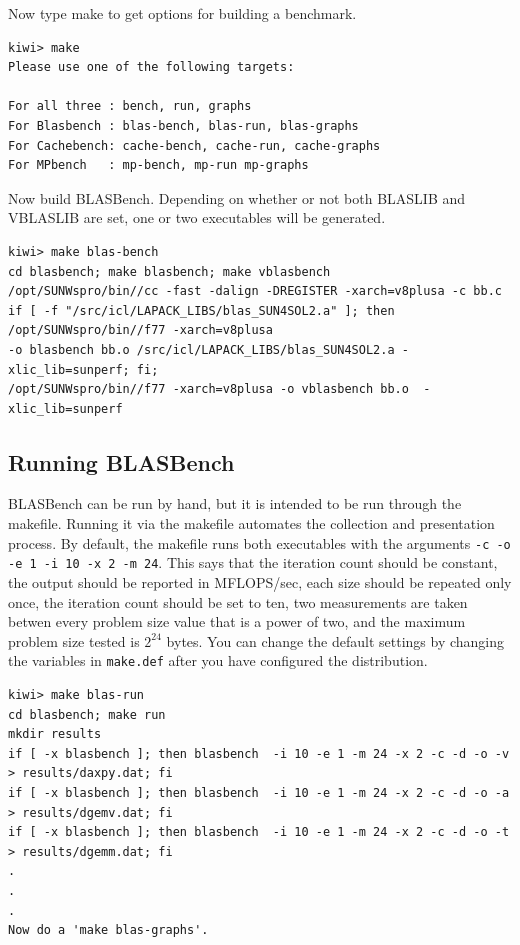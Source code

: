\documentclass [12pt]{article}
\begin{document}
Now type make to get options for building a benchmark.

\begin{verbatim}
kiwi> make
Please use one of the following targets:

For all three : bench, run, graphs
For Blasbench : blas-bench, blas-run, blas-graphs
For Cachebench: cache-bench, cache-run, cache-graphs
For MPbench   : mp-bench, mp-run mp-graphs

\end{verbatim}

Now build BLASBench.  Depending on whether or not both BLASLIB and VBLASLIB are set,
one or two executables will be generated.

\begin{verbatim}
kiwi> make blas-bench
cd blasbench; make blasbench; make vblasbench
/opt/SUNWspro/bin//cc -fast -dalign -DREGISTER -xarch=v8plusa -c bb.c
if [ -f "/src/icl/LAPACK_LIBS/blas_SUN4SOL2.a" ]; then /opt/SUNWspro/bin//f77 -xarch=v8plusa
-o blasbench bb.o /src/icl/LAPACK_LIBS/blas_SUN4SOL2.a -xlic_lib=sunperf; fi;
/opt/SUNWspro/bin//f77 -xarch=v8plusa -o vblasbench bb.o  -xlic_lib=sunperf

\end{verbatim}

\subsection{Running BLASBench}

BLASBench can be run by hand, but it is intended to be run through the
makefile. Running it via the makefile automates the collection and
presentation process. By default, the makefile runs both executables
with the arguments {\tt -c -o -e 1 -i 10 -x 2 -m 24}. This says that the iteration count
should be constant, the output should be reported in MFLOPS/sec, each
size should be repeated only once, the iteration count should be
set to ten, two measurements are taken betwen every problem size value that is a power of two, 
and the maximum problem size tested is $2 ^{24}$ bytes. You can change the default settings 
by changing the variables in {\tt make.def} after you have configured the distribution.

\begin{verbatim}
kiwi> make blas-run
cd blasbench; make run
mkdir results
if [ -x blasbench ]; then blasbench  -i 10 -e 1 -m 24 -x 2 -c -d -o -v > results/daxpy.dat; fi
if [ -x blasbench ]; then blasbench  -i 10 -e 1 -m 24 -x 2 -c -d -o -a > results/dgemv.dat; fi
if [ -x blasbench ]; then blasbench  -i 10 -e 1 -m 24 -x 2 -c -d -o -t > results/dgemm.dat; fi
.
.
.
Now do a 'make blas-graphs'.

\end{verbatim}
\end{document}
